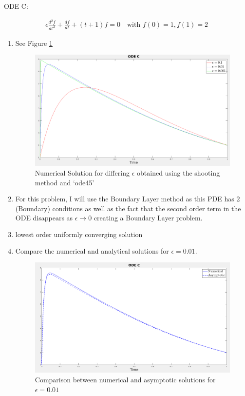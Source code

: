 \documentclass{article}
\begin{document}
\begin{enumerate}[label=\alph*.]
\end{enumerate}

\vspace{20pt}

ODE C: 

\begin{gather*}
    \epsilon\frac{d^2f}{dt^2} + \frac{df}{dt} + (t+1)f = 0 \quad
    \text{with } f(0) = 1, f(1) = 2
\end{gather*}

\begin{enumerate}[label=\alph*.]
    \item See Figure \ref{fig:ODEC_num_sol}
        \begin{figure}[ht]
            \centering
            \includegraphics[width=\textwidth]{images/ODEC.png}
            \caption{Numerical Solution for differing $\epsilon$ obtained using
            the shooting method and `ode45'}
            \label{fig:ODEC_num_sol}
        \end{figure}
    \item For this problem, I will use the Boundary Layer method as this PDE has
    2 (Boundary) conditions as well as the fact that the second order term in
    the ODE disappears as $\epsilon \to 0$ creating a Boundary Layer problem.
    \item lowest order uniformly converging solution
    \item Compare the numerical and analytical solutions for $\epsilon = 0.01$. 
        \begin{figure}
            \centering
            \includegraphics[width=\textwidth]{images/ODEC_sol.png}
            \caption*{Comparison between numerical and asymptotic solutions for
            $\epsilon = 0.01$}
        \end{figure}


\end{enumerate}
\end{document}
